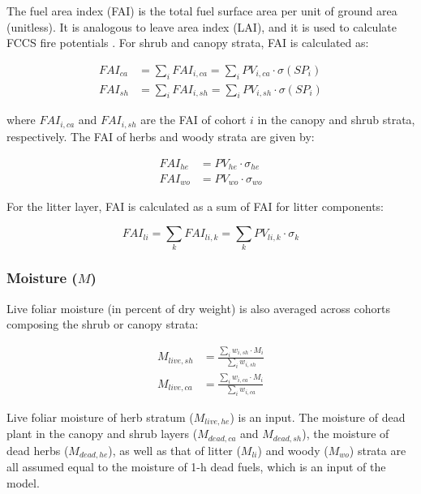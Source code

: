 \documentclass[]{book}
\begin{document}
The fuel area index (FAI) is the total fuel surface area per unit of
ground area (unitless). It is analogous to leave area index (LAI), and
it is used to calculate FCCS fire potentials \citep{Schaaf2007}. For
shrub and canopy strata, FAI is calculated as:

\begin{eqnarray}
FAI_{ca} &= \sum_{i}{FAI_{i, ca}} = \sum_{i}{PV_{i,ca} \cdot\sigma(SP_i)}\\
FAI_{sh} &= \sum_{i}{FAI_{i, sh}}= \sum_{i}{PV_{i,sh} \cdot \sigma(SP_i)}
\end{eqnarray}

where \(FAI_{i, ca}\) and \(FAI_{i, sh}\) are the FAI of cohort \(i\) in
the canopy and shrub strata, respectively. The FAI of herbs and woody
strata are given by:

\begin{eqnarray}
FAI_{he} &= PV_{he} \cdot \sigma_{he}\\
FAI_{wo} &= PV_{wo} \cdot \sigma_{wo}
\end{eqnarray}

For the litter layer, FAI is calculated as a sum of FAI for litter
components:

\begin{equation}
FAI_{li} = \sum_{k}{FAI_{li,k}} = \sum_{k}{PV_{li,k} \cdot \sigma_{k}}
\end{equation}

\subsubsection{\texorpdfstring{Moisture
(\(M\))}{Moisture (M)}}\label{moisture-m}

Live foliar moisture (in percent of dry weight) is also averaged across
cohorts composing the shrub or canopy strata:

\begin{eqnarray}
M_{live, sh} &= \frac{\sum_{i}{w_{i,sh} \cdot M_i}}{\sum_{i}{w_{i,sh}}} \\
M_{live, ca} &= \frac{\sum_{i}{w_{i,ca} \cdot M_i}}{\sum_{i}{w_{i,ca}}}
\end{eqnarray}

Live foliar moisture of herb stratum (\(M_{live, he}\)) is an input. The
moisture of dead plant in the canopy and shrub layers (\(M_{dead, ca}\)
and \(M_{dead, sh}\)), the moisture of dead herbs (\(M_{dead, he}\)), as
well as that of litter (\(M_{li}\)) and woody (\(M_{wo}\)) strata are
all assumed equal to the moisture of 1-h dead fuels, which is an input
of the model.
\end{document}
